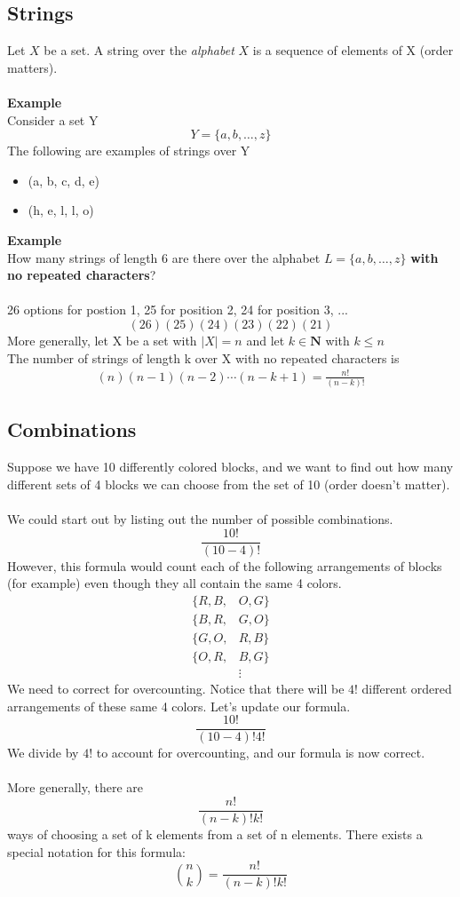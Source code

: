 \documentclass[12pt]{article}
\begin{document}
	\subsection{Strings}
	Let $X$ be a set. A string over the \textit{alphabet} $X$ is a sequence of elements of X (order matters).\\\\
	\textbf{Example}\\
	Consider a set Y
	$$ Y = \{a, b, \ldots, z\} $$
	The following are examples of strings over Y
	\begin{itemize}
		\item (a, b, c, d, e)
		\item (h, e, l, l, o)
	\end{itemize}
	\textbf{Example}\\
	How many strings of length 6 are there over the alphabet $L = \{a, b, \ldots, z\}$ \textbf{with no repeated characters}? \\\\
	26 options for postion 1, 25 for position 2, 24 for position 3, ...
	$$(26)(25)(24)(23)(22)(21)$$
	More generally, let X be a set with $|X| = n$ and let $k \in \mathbf{N}$ with $k \leq n$ \\
	The number of strings of length k over X with no repeated characters is
	\begin{align*}
		(n)(n - 1)(n - 2)\cdots(n - k + 1) = \frac{n!}{(n - k)!}
	\end{align*}
	\subsection{Combinations}
	Suppose we have 10 differently colored blocks, and we want to find out how many different sets of 4 blocks we can choose from the set of 10 (order doesn't matter).\\\\
	We could start out by listing out the number of possible combinations.
	$$ \frac{10!}{(10 - 4)!} $$
	However, this formula would count each of the following arrangements of blocks (for example) even though they all contain the same 4 colors.
	\begin{align*}
		\{R, B,& O, G\}\\
		\{B, R,& G, O\}\\
		\{G, O,& R, B\}\\
		\{O, R,& B, G\}\\
			   &\vdots
	\end{align*}
	We need to correct for overcounting. Notice that there will be $4!$ different ordered arrangements of these same 4 colors. Let's update our formula.
	$$\frac{10!}{(10 - 4)!4!}$$
	We divide by $4!$ to account for overcounting, and our formula is now correct.\\\\
	More generally, there are $$\frac{n!}{(n - k)!k!}$$ ways of choosing a set of k elements from a set of n elements. There exists a special notation for this formula:
	$${n \choose k} = \frac{n!}{(n - k)! k!}$$
\end{document}
